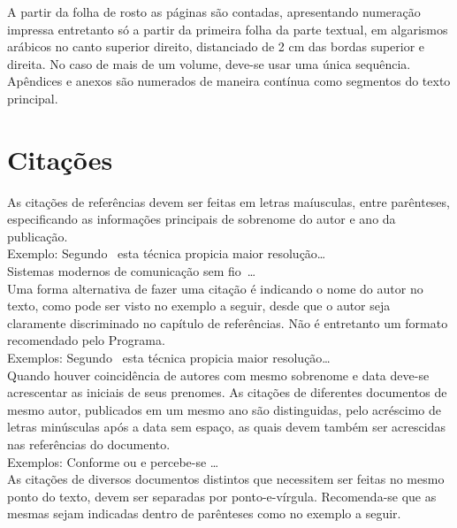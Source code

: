 \documentclass[repeatfields,xlists,xpacks,oneside]{ufrgscca}
\begin{document}
A partir da folha de rosto as páginas são contadas, apresentando numeração
impressa entretanto só a partir da primeira folha da parte textual, em
algarismos arábicos no canto superior direito, distanciado de 2 cm das
bordas superior e direita. No caso de mais de um volume, deve-se usar uma
única sequência. Apêndices e anexos são numerados de maneira contínua como
segmentos do texto principal.

\section{Citações}

As citações de referências devem ser feitas em letras maíusculas, entre
parênteses, especificando as informações principais de sobrenome do autor e
ano da publicação.\\

Exemplo: Segundo~\cite{Brito:IEE-1994} esta técnica propicia maior
resolução\ldots\\

Sistemas modernos de comunicação sem fio~\cite{Bilstrup:FCS-239}\ldots\\

Uma forma alternativa de fazer uma citação é indicando o nome do autor no
texto, como pode ser visto no exemplo a seguir, desde que o autor seja
claramente discriminado no capítulo de referências. Não é entretanto um
formato recomendado pelo Programa.\\

Exemplos: Segundo~\textcite{Brito:IEE-1994} esta técnica propicia maior
resolução\ldots\\

Quando houver coincidência de autores com mesmo sobrenome e data deve-se
acrescentar as iniciais de seus prenomes. As citações de diferentes
documentos de mesmo autor, publicados em um mesmo ano são distinguidas, pelo
acréscimo de letras minúsculas após a data sem espaço, as quais devem também
ser acrescidas nas referências do documento.\\

Exemplos: Conforme \cite{Pereira:OORT1999-133} ou \cite{Pereira:OORT1999-155} e
\cite{Pereira:RTP1999-9} percebe-se \ldots\\

As citações de diversos documentos distintos que necessitem ser feitas no
mesmo ponto do texto, devem ser separadas por ponto-e-vírgula. Recomenda-se
que as mesmas sejam indicadas dentro de parênteses como no exemplo a
seguir.\\
\end{document}

